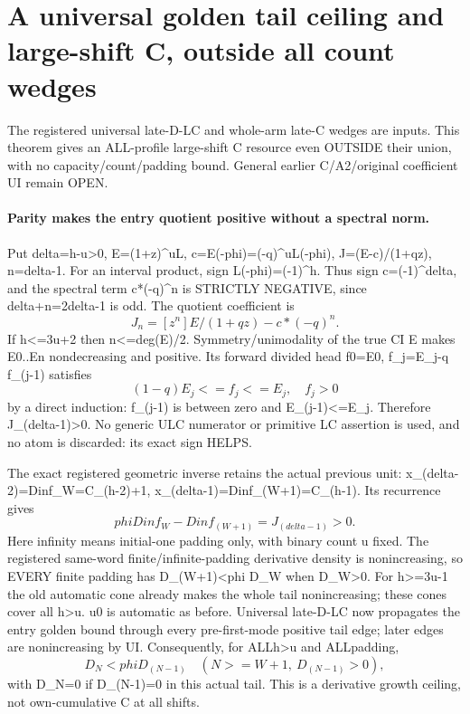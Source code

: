 \section{A universal golden tail ceiling and large-shift C, outside all count wedges}
The registered universal late-D-LC and whole-arm late-C wedges
are inputs. This theorem gives an ALL-profile large-shift C resource
even OUTSIDE their union, with no capacity/count/padding bound.
General earlier C/A2/original coefficient UI remain OPEN.

\paragraph{Parity makes the entry quotient positive without a spectral norm.}
Put delta=h-u>0, E=(1+z)^uL, c=E(-phi)=(-q)^uL(-phi),
J=(E-c)/(1+qz), n=delta-1. For an interval product,
sign L(-phi)=(-1)^h. Thus sign c=(-1)^delta, and the spectral
term c*(-q)^n is STRICTLY NEGATIVE, since delta+n=2delta-1 is odd.
The quotient coefficient is
\[
 J_n=[z^n]E/(1+qz)-c*(-q)^n.
\]
If h<=3u+2 then n<=deg(E)/2. Symmetry/unimodality of the true CI E
makes E0..En nondecreasing and positive. Its forward divided head
f0=E0, f_j=E_j-q f_(j-1) satisfies
\[
 (1-q)E_j<=f_j<=E_j,\quad f_j>0
\]
by a direct induction: f_(j-1) is between zero and E_(j-1)<=E_j.
Therefore J_(delta-1)>0. No generic ULC numerator or primitive LC
assertion is used, and no atom is discarded: its exact sign HELPS.

The exact registered geometric inverse retains the actual previous unit:
x_(delta-2)=Dinf_W=C_(h-2)+1, x_(delta-1)=Dinf_(W+1)=C_(h-1).
Its recurrence gives
\[
 phi Dinf_W-Dinf_(W+1)=J_(delta-1)>0.
\]
Here infinity means initial-one padding only, with binary count u fixed.
The registered same-word finite/infinite-padding derivative density is
nonincreasing, so EVERY finite padding has D_(W+1)<phi D_W when D_W>0.
For h>=3u-1 the old automatic cone already makes the whole tail
nonincreasing; these cones cover all h>u. u0 is automatic as before.
Universal late-D-LC now propagates the entry golden bound through every
pre-first-mode positive tail edge; later edges are nonincreasing by UI.
Consequently, for ALLh>u and ALLpadding,
\[
 D_N<phi D_(N-1)\quad(N>=W+1,\ D_(N-1)>0),
\]
with D_N=0 if D_(N-1)=0 in this actual tail. This is a derivative
growth ceiling, not own-cumulative C at all shifts.

